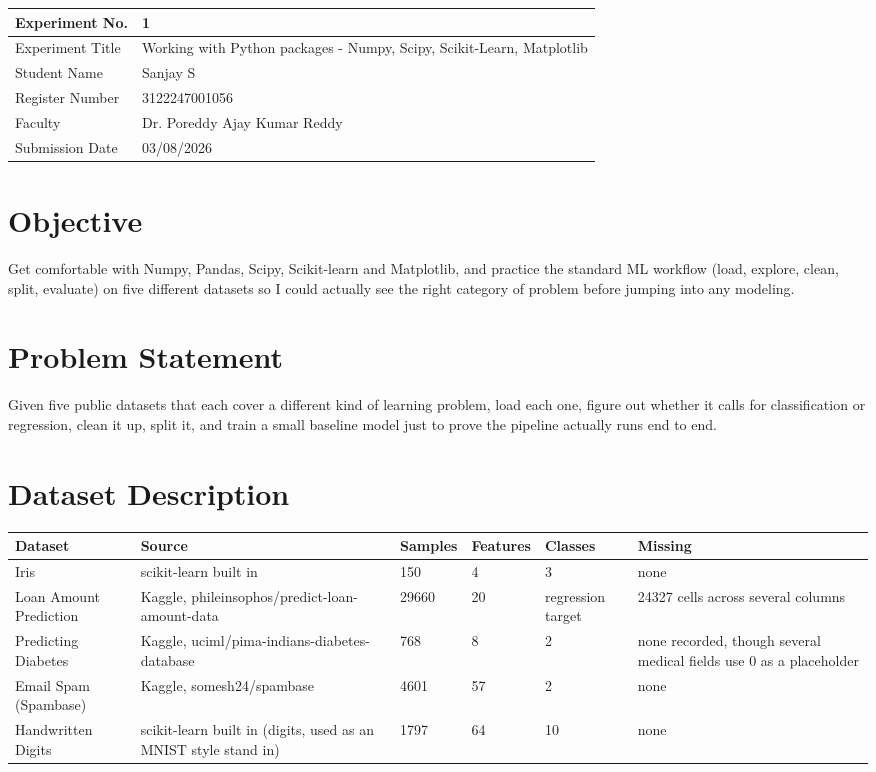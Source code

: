 \documentclass[12pt,a4paper]{article}
\begin{document}
\begin{tabular}{|p{4cm}|p{11cm}|}
\hline
Experiment No. & 1 \\ \hline
Experiment Title & Working with Python packages - Numpy, Scipy, Scikit-Learn, Matplotlib\footnotemark \\ \hline
Student Name & Sanjay S \\ \hline
Register Number & 3122247001056 \\ \hline
Faculty & Dr. Poreddy Ajay Kumar Reddy \\ \hline
Submission Date & 03/08/2026 \\ \hline
\end{tabular}

\section{Objective}
Get comfortable with Numpy, Pandas, Scipy, Scikit-learn and Matplotlib, and practice the standard ML
workflow (load, explore, clean, split, evaluate) on five different datasets so I could actually see the
right category of problem before jumping into any modeling.

\section{Problem Statement}
Given five public datasets that each cover a different kind of learning problem, load each one, figure
out whether it calls for classification or regression, clean it up, split it, and train a small baseline
model just to prove the pipeline actually runs end to end.

\section{Dataset Description}
\begin{longtable}{|p{3.3cm}|p{2.6cm}|p{1.6cm}|p{1.8cm}|p{1.6cm}|p{2cm}|}
\hline
\textbf{Dataset} & \textbf{Source} & \textbf{Samples} & \textbf{Features} & \textbf{Classes} & \textbf{Missing} \\ \hline
Iris & scikit-learn built in & 150 & 4 & 3 & none \\ \hline
Loan Amount Prediction & Kaggle, phileinsophos\slash predict-loan-amount-data & 29660 & 20 & regression target & 24327 cells across several columns \\ \hline
Predicting Diabetes & Kaggle, uciml\slash pima-indians-diabetes-database & 768 & 8 & 2 & none recorded, though several medical fields use 0 as a placeholder \\ \hline
Email Spam (Spambase) & Kaggle, somesh24\slash spambase & 4601 & 57 & 2 & none \\ \hline
Handwritten Digits & scikit-learn built in (digits, used as an MNIST style stand in) & 1797 & 64 & 10 & none \\ \hline
\end{longtable}
\end{document}
